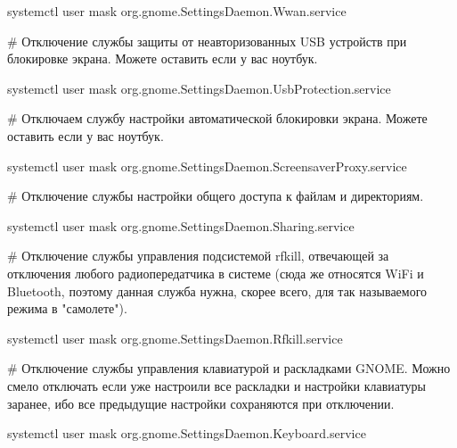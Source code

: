 \documentclass[letterpaper,10pt,russian,openany]{sphinxmanual}
\begin{document}
\begin{sphinxVerbatim}[commandchars=\\\{\}]
systemctl \PYGZhy{}\PYGZhy{}user mask org.gnome.SettingsDaemon.Wwan.service
\end{sphinxVerbatim}

\sphinxAtStartPar
\# Отключение службы защиты от неавторизованных USB устройств при блокировке экрана.
Можете оставить если у вас ноутбук.

\begin{sphinxVerbatim}[commandchars=\\\{\}]
systemctl \PYGZhy{}\PYGZhy{}user mask org.gnome.SettingsDaemon.UsbProtection.service
\end{sphinxVerbatim}

\sphinxAtStartPar
\# Отключаем службу настройки автоматической блокировки экрана.
Можете оставить если у вас ноутбук.

\begin{sphinxVerbatim}[commandchars=\\\{\}]
systemctl \PYGZhy{}\PYGZhy{}user mask org.gnome.SettingsDaemon.ScreensaverProxy.service
\end{sphinxVerbatim}

\sphinxAtStartPar
\# Отключение службы настройки общего доступа к файлам и директориям.

\begin{sphinxVerbatim}[commandchars=\\\{\}]
systemctl \PYGZhy{}\PYGZhy{}user mask org.gnome.SettingsDaemon.Sharing.service
\end{sphinxVerbatim}

\sphinxAtStartPar
\# Отключение службы управления подсистемой rfkill, отвечающей за отключения любого радиопередатчика в системе
(сюда же относятся Wi\sphinxhyphen{}Fi и Bluetooth, поэтому данная служба нужна, скорее всего, для так называемого режима в "самолете").

\begin{sphinxVerbatim}[commandchars=\\\{\}]
systemctl \PYGZhy{}\PYGZhy{}user mask org.gnome.SettingsDaemon.Rfkill.service
\end{sphinxVerbatim}

\sphinxAtStartPar
\# Отключение службы управления клавиатурой и раскладками GNOME.
Можно смело отключать если уже настроили все раскладки и настройки клавиатуры заранее,
ибо все предыдущие настройки сохраняются при отключении.

\begin{sphinxVerbatim}[commandchars=\\\{\}]
systemctl \PYGZhy{}\PYGZhy{}user mask org.gnome.SettingsDaemon.Keyboard.service
\end{sphinxVerbatim}
\end{document}
